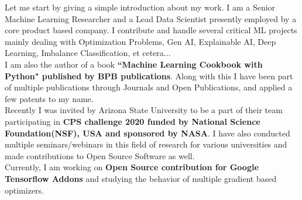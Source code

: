 \begin{justify}
    Let me start by giving a simple introduction about my work. I am a Senior Machine Learning Researcher and a Lead Data Scientist presently employed by a core product based company. I contribute and handle several critical ML projects mainly dealing with Optimization Problems, Gen AI, Explainable AI, Deep Learning, Imbalance Classification, et cetera...\\
    I am also the author of a book \textbf{``Machine Learning Cookbook with Python" published by BPB publications}. Along with this I have been part of multiple publications through Journals and Open Publications, and applied a few patents to my name.\\
    Recently I was invited by Arizona State University to be a part of their team participating in \textbf{CPS challenge 2020 funded by National Science Foundation(NSF), USA and sponsored by NASA}. I have also conducted multiple seminars/webinars in this field of research for various universities and made contributions to Open Source Software as well.\\
    Currently, I am working on \textbf{Open Source contribution for Google Tensorflow Addons} and studying the behavior of multiple gradient based optimizers.
\end{justify}
